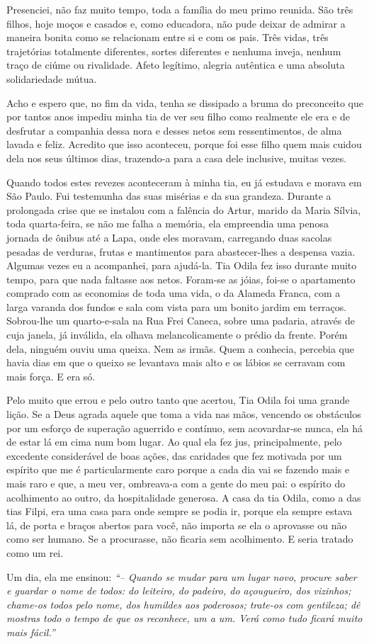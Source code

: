 Presenciei, não faz muito tempo, toda a família do meu primo reunida.
São três filhos, hoje moços e casados e, como educadora, não pude deixar de admirar a maneira bonita como se relacionam entre si e com os pais.
Três vidas, três trajetórias totalmente diferentes, sortes diferentes e nenhuma inveja, nenhum traço de ciúme ou rivalidade.
Afeto legítimo, alegria autêntica e uma absoluta solidariedade mútua.

Acho e espero que, no fim da vida, tenha se dissipado a bruma do preconceito que por tantos anos impediu minha tia de ver seu filho como realmente ele era e de desfrutar a companhia dessa nora e desses netos sem ressentimentos, de alma lavada e feliz.
Acredito que isso aconteceu, porque foi esse filho quem mais cuidou dela nos seus últimos dias, trazendo-a para a casa dele inclusive, muitas vezes.

 
Quando todos estes revezes aconteceram à minha tia, eu já estudava e morava em São Paulo.
Fui testemunha das suas misérias e da sua grandeza.
Durante a prolongada crise que se instalou com a falência do Artur, marido da Maria Sílvia, toda quarta-feira, se não me falha a memória, ela empreendia uma penosa jornada de ônibus até a Lapa, onde eles moravam, carregando duas sacolas pesadas de verduras, frutas e mantimentos para abastecer-lhes a despensa vazia.
Algumas vezes eu a acompanhei, para ajudá-la.
Tia Odila fez isso durante muito tempo, para que nada faltasse aos netos.
Foram-se as jóias, foi-se o apartamento comprado com as economias de toda uma vida, o da Alameda Franca, com a larga varanda dos fundos e sala com vista para um bonito jardim em terraços.
Sobrou-lhe um quarto-e-sala na Rua Frei Caneca, sobre uma padaria, através de cuja janela, já inválida, ela olhava melancolicamente o prédio da frente.
Porém dela, ninguém ouviu uma queixa.
Nem as irmãs.
Quem a conhecia, percebia que havia dias em que o queixo se levantava mais alto e os lábios se cerravam com mais força.
E era só.
 

Pelo muito que errou e pelo outro tanto que acertou, Tia Odila foi uma grande lição.
Se a Deus agrada aquele que toma a vida nas mãos, vencendo os obstáculos por um esforço de superação aguerrido e contínuo, sem acovardar-se nunca, ela há de estar lá em cima num bom lugar.
Ao qual ela fez jus, principalmente, pelo excedente considerável de boas ações, das caridades que fez motivada por um espírito que me é particularmente caro porque a cada dia vai se fazendo mais e mais raro e que, a meu ver, ombreava-a com a gente do meu pai: o espírito do acolhimento ao outro, da hospitalidade generosa.
A casa da tia Odila, como a das tias Filpi, era uma casa para onde sempre se podia ir, porque ela sempre estava lá, de porta e braços abertos para você, não importa se ela o aprovasse ou não como ser humano.
Se a procurasse, não ficaria sem acolhimento.
E seria tratado como um rei.


Um dia, ela me ensinou: 
{\small\itshape``-- Quando se mudar para um lugar novo, procure saber e guardar o nome de todos: do leiteiro, do padeiro, do açougueiro, dos vizinhos; chame-os todos pelo nome, dos humildes aos poderosos; trate-os com gentileza; dê mostras todo o tempo de que os reconhece, um a um.
Verá como tudo ficará muito mais fácil.''}

